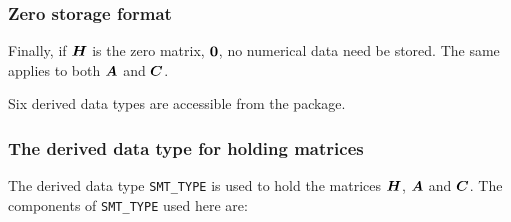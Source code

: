 \documentclass{galahad}
\begin{document}
\subsubsection{Zero storage format}\label{zero}
Finally, if ${\bm{H}}$ is the zero matrix, ${\bm{0}}$,
no numerical data need be stored. The same applies to both ${\bm{A}}$ and ${\bm{C}}$.








\galtypes
Six derived data types are accessible from the package.


\subsubsection{The derived data type for holding matrices}\label{typesmt}
The derived data type {\tt SMT\_TYPE} is used to hold the matrices ${\bm{H}}$,
${\bm{A}}$ and ${\bm{C}}$. The components of {\tt SMT\_TYPE} used here are:
\end{document}

